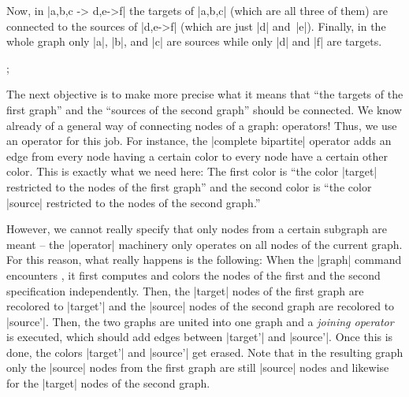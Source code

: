 Now, in |{a,b,c} -> {d,e->f}| the targets  of |{a,b,c}| (which are all
three of them) are connected to the sources of |{d,e->f}| (which are
just |d| and~|e|). Finally, in the whole graph only |a|, |b|, and |c|
are sources while only  |d| and |f| are targets.

\begin{codeexample}[]
\def\hilightsource#1{\fill [green, opacity=.25] (#1) circle [radius=2mm]; }  
\def\hilighttarget#1{\fill [red,   opacity=.25] (#1) circle [radius=2mm]; }  
\tikz {};
\end{codeexample}

The next objective is to make more precise what it means that ``the
targets of the first graph'' and the ``sources of the second graph''
should be connected. We know already of a general way of connecting
nodes of a graph: operators! Thus, we use an operator for this job.
For instance, the |complete bipartite| operator adds an edge from every node
having a certain color to every node have a certain other color. This
is exactly what we need here: The first color is ``the color |target|
restricted to the nodes of the first graph'' and the second color is
``the color |source| restricted to the nodes of the second graph.''

However, we cannot really specify that only nodes from a certain
subgraph are meant -- the |operator| machinery only operates on all
nodes of the current graph. For this reason, what really happens is
the following: When the |graph| command encounters 
 , it first computes and
colors the nodes of the first and the second specification
independently. Then, the |target| nodes of the first graph are
recolored to |target'| and the |source| nodes of the second graph are
recolored to |source'|. Then, the two graphs are united into one
graph and a \emph{joining operator} is executed, which should add
edges between |target'| and |source'|. Once this is done, 
the colors |target'| and |source'| get erased. Note that in the
resulting graph only the |source| nodes from the first graph are still
|source| nodes and likewise for the |target| nodes of the second graph.


